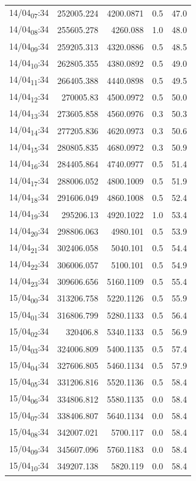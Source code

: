 \documentclass[11pt]{article}
\begin{document}
\begin{center}
\begin{tabular}{lrrrr}
14/04\textsubscript{07}:34 & 252005.224 & 4200.0871 & 0.5 & 47.0\\[0pt]
14/04\textsubscript{08}:34 & 255605.278 & 4260.088 & 1.0 & 48.0\\[0pt]
14/04\textsubscript{09}:34 & 259205.313 & 4320.0886 & 0.5 & 48.5\\[0pt]
14/04\textsubscript{10}:34 & 262805.355 & 4380.0892 & 0.5 & 49.0\\[0pt]
14/04\textsubscript{11}:34 & 266405.388 & 4440.0898 & 0.5 & 49.5\\[0pt]
14/04\textsubscript{12}:34 & 270005.83 & 4500.0972 & 0.5 & 50.0\\[0pt]
14/04\textsubscript{13}:34 & 273605.858 & 4560.0976 & 0.3 & 50.3\\[0pt]
14/04\textsubscript{14}:34 & 277205.836 & 4620.0973 & 0.3 & 50.6\\[0pt]
14/04\textsubscript{15}:34 & 280805.835 & 4680.0972 & 0.3 & 50.9\\[0pt]
14/04\textsubscript{16}:34 & 284405.864 & 4740.0977 & 0.5 & 51.4\\[0pt]
14/04\textsubscript{17}:34 & 288006.052 & 4800.1009 & 0.5 & 51.9\\[0pt]
14/04\textsubscript{18}:34 & 291606.049 & 4860.1008 & 0.5 & 52.4\\[0pt]
14/04\textsubscript{19}:34 & 295206.13 & 4920.1022 & 1.0 & 53.4\\[0pt]
14/04\textsubscript{20}:34 & 298806.063 & 4980.101 & 0.5 & 53.9\\[0pt]
14/04\textsubscript{21}:34 & 302406.058 & 5040.101 & 0.5 & 54.4\\[0pt]
14/04\textsubscript{22}:34 & 306006.057 & 5100.101 & 0.5 & 54.9\\[0pt]
14/04\textsubscript{23}:34 & 309606.656 & 5160.1109 & 0.5 & 55.4\\[0pt]
15/04\textsubscript{00}:34 & 313206.758 & 5220.1126 & 0.5 & 55.9\\[0pt]
15/04\textsubscript{01}:34 & 316806.799 & 5280.1133 & 0.5 & 56.4\\[0pt]
15/04\textsubscript{02}:34 & 320406.8 & 5340.1133 & 0.5 & 56.9\\[0pt]
15/04\textsubscript{03}:34 & 324006.809 & 5400.1135 & 0.5 & 57.4\\[0pt]
15/04\textsubscript{04}:34 & 327606.805 & 5460.1134 & 0.5 & 57.9\\[0pt]
15/04\textsubscript{05}:34 & 331206.816 & 5520.1136 & 0.5 & 58.4\\[0pt]
15/04\textsubscript{06}:34 & 334806.812 & 5580.1135 & 0.0 & 58.4\\[0pt]
15/04\textsubscript{07}:34 & 338406.807 & 5640.1134 & 0.0 & 58.4\\[0pt]
15/04\textsubscript{08}:34 & 342007.021 & 5700.117 & 0.0 & 58.4\\[0pt]
15/04\textsubscript{09}:34 & 345607.096 & 5760.1183 & 0.0 & 58.4\\[0pt]
15/04\textsubscript{10}:34 & 349207.138 & 5820.119 & 0.0 & 58.4\\[0pt]
\end{tabular}
\end{center}
\end{document}

